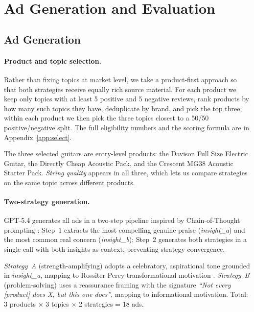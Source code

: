 \documentclass[11pt]{article}
\begin{document}
\section{Ad Generation and Evaluation}
\label{sec:ads}

\subsection{Ad Generation}
\label{sec:adgen}

\paragraph{Product and topic selection.}
Rather than fixing topics at market level, we take a product-first
approach so that both strategies receive equally rich source
material.
For each product we keep only topics with at least 5 positive and 5
negative reviews, rank products by how many such topics they have,
deduplicate by brand, and pick the top three; within each product we
then pick the three topics closest to a 50/50 positive/negative
split.
The full eligibility numbers and the scoring formula are in
Appendix~\ref{app:select}.

The three selected guitars are entry-level products: the Davison
Full Size Electric Guitar, the Directly Cheap Acoustic Pack, and
the Crescent MG38 Acoustic Starter Pack.
\textit{String quality} appears in all three, which lets us compare
strategies on the same topic across different products.

\paragraph{Two-strategy generation.}
GPT-5.4 generates all ads in a two-step pipeline inspired by
Chain-of-Thought prompting \cite{wei2022chain}: Step~1 extracts
the most compelling genuine praise (\textit{insight\_a}) and the
most common real concern (\textit{insight\_b}); Step~2 generates
both strategies in a single call with both insights as context,
preventing strategy convergence.

\textit{Strategy~A} (strength-amplifying) adopts a celebratory,
aspirational tone grounded in \textit{insight\_a}, mapping to
Rossiter-Percy transformational motivation
\cite{rossiter1991grid}.
\textit{Strategy~B} (problem-solving) uses a reassurance framing
with the signature \textit{``Not every [product] does X, but this
one does''}, mapping to informational motivation.
Total: 3 products $\times$ 3 topics $\times$ 2 strategies = 18 ads.
\end{document}
